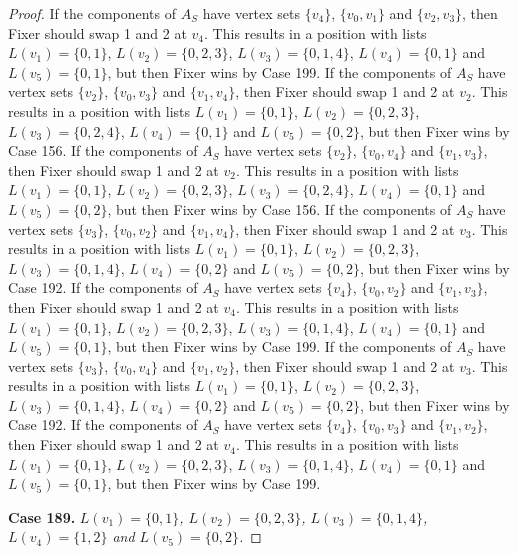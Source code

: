 \documentclass[12pt]{amsart}
\theoremstyle{plain}
\theoremstyle{definition}
\theoremstyle{remark}
\begin{document}
\begin{proof}
If the components of $A_S$ have vertex sets $\{v_4\}$, $\{v_0, v_1\}$ and $\{v_2, v_3\}$, then Fixer should swap 1 and 2 at $v_4$. This results in a position with lists $L(v_1) = \{0, 1\}$, $L(v_2) = \{0, 2, 3\}$, $L(v_3) = \{0, 1, 4\}$, $L(v_4) = \{0, 1\}$ and $L(v_5) = \{0, 1\}$, but then Fixer wins by Case 199.
If the components of $A_S$ have vertex sets $\{v_2\}$, $\{v_0, v_3\}$ and $\{v_1, v_4\}$, then Fixer should swap 1 and 2 at $v_2$. This results in a position with lists $L(v_1) = \{0, 1\}$, $L(v_2) = \{0, 2, 3\}$, $L(v_3) = \{0, 2, 4\}$, $L(v_4) = \{0, 1\}$ and $L(v_5) = \{0, 2\}$, but then Fixer wins by Case 156.
If the components of $A_S$ have vertex sets $\{v_2\}$, $\{v_0, v_4\}$ and $\{v_1, v_3\}$, then Fixer should swap 1 and 2 at $v_2$. This results in a position with lists $L(v_1) = \{0, 1\}$, $L(v_2) = \{0, 2, 3\}$, $L(v_3) = \{0, 2, 4\}$, $L(v_4) = \{0, 1\}$ and $L(v_5) = \{0, 2\}$, but then Fixer wins by Case 156.
If the components of $A_S$ have vertex sets $\{v_3\}$, $\{v_0, v_2\}$ and $\{v_1, v_4\}$, then Fixer should swap 1 and 2 at $v_3$. This results in a position with lists $L(v_1) = \{0, 1\}$, $L(v_2) = \{0, 2, 3\}$, $L(v_3) = \{0, 1, 4\}$, $L(v_4) = \{0, 2\}$ and $L(v_5) = \{0, 2\}$, but then Fixer wins by Case 192.
If the components of $A_S$ have vertex sets $\{v_4\}$, $\{v_0, v_2\}$ and $\{v_1, v_3\}$, then Fixer should swap 1 and 2 at $v_4$. This results in a position with lists $L(v_1) = \{0, 1\}$, $L(v_2) = \{0, 2, 3\}$, $L(v_3) = \{0, 1, 4\}$, $L(v_4) = \{0, 1\}$ and $L(v_5) = \{0, 1\}$, but then Fixer wins by Case 199.
If the components of $A_S$ have vertex sets $\{v_3\}$, $\{v_0, v_4\}$ and $\{v_1, v_2\}$, then Fixer should swap 1 and 2 at $v_3$. This results in a position with lists $L(v_1) = \{0, 1\}$, $L(v_2) = \{0, 2, 3\}$, $L(v_3) = \{0, 1, 4\}$, $L(v_4) = \{0, 2\}$ and $L(v_5) = \{0, 2\}$, but then Fixer wins by Case 192.
If the components of $A_S$ have vertex sets $\{v_4\}$, $\{v_0, v_3\}$ and $\{v_1, v_2\}$, then Fixer should swap 1 and 2 at $v_4$. This results in a position with lists $L(v_1) = \{0, 1\}$, $L(v_2) = \{0, 2, 3\}$, $L(v_3) = \{0, 1, 4\}$, $L(v_4) = \{0, 1\}$ and $L(v_5) = \{0, 1\}$, but then Fixer wins by Case 199.

\noindent\textbf{Case 189.  }\textit{$L(v_1) = \{0, 1\}$, $L(v_2) = \{0, 2, 3\}$, $L(v_3) = \{0, 1, 4\}$, $L(v_4) = \{1, 2\}$ and $L(v_5) = \{0, 2\}$.}


\end{proof}
\end{document}
